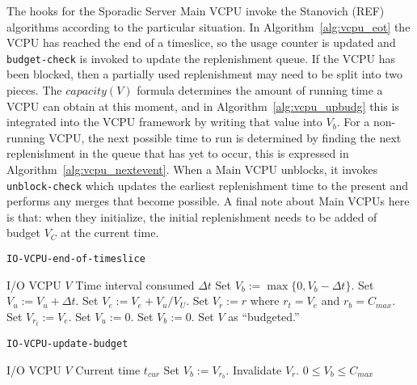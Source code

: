 \documentclass[twocolumn,10pt]{article}
\begin{document}
The hooks for the Sporadic Server Main VCPU invoke the Stanovich (REF)
algorithms according to the particular situation.  In
Algorithm~\ref{alg:vcpu_eot} the VCPU has reached the end of a
timeslice, so the usage counter is updated and {\tt budget-check} is
invoked to update the replenishment queue.  If the VCPU has been
blocked, then a partially used replenishment may need to be split into
two pieces.  The $capacity(V)$ formula determines the amount of
running time a VCPU can obtain at this moment, and in
Algorithm~\ref{alg:vcpu_upbudg} this is integrated into the VCPU
framework by writing that value into $V_b$.  For a non-running VCPU,
the next possible time to run is determined by finding the next
replenishment in the queue that has yet to occur, this is expressed in
Algorithm~\ref{alg:vcpu_nextevent}.  When a Main VCPU unblocks, it
invokes {\tt unblock-check} which updates the earliest replenishment
time to the present and performs any merges that become possible.  A
final note about Main VCPUs here is that: when they initialize, the
initial replenishment needs to be added of budget $V_C$ at the current
time.

\begin{algorithm*}
  \caption{\tt IO-VCPU-end-of-timeslice}\label{alg:iovcpu_eot}
  \begin{algorithmic}[1]
    \REQUIRE I/O VCPU $V$
    \REQUIRE Time interval consumed $\Delta t$
    \STATE Set $V_b:=\max\{0,V_b-\Delta t\}$.
    \STATE Set $V_u:=V_u+\Delta t$.
    \STATE Set $V_e:=V_e+V_u/V_U$.
    \STATE Set $V_r:=r$ where $r_t=V_e$ and $r_b=C_{max}$.
    \ELSE
    \STATE Set $V_{r_t}:=V_e$.
    \ENDIF
    \STATE Set $V_u:=0$.
    \STATE Set $V_b:=0$.
    \STATE Set $V$ as \NOT ``budgeted.''
    \ENDIF
    \ENDIF
  \end{algorithmic}
\end{algorithm*}

\begin{algorithm}
  \caption{\tt IO-VCPU-update-budget}\label{alg:iovcpu_upbudg}
  \begin{algorithmic}[1]
    \REQUIRE I/O VCPU $V$
    \REQUIRE Current time $t_{cur}$
    \STATE Set $V_b:=V_{r_b}$.
    \STATE Invalidate $V_r$.
    \ENDIF
    \ENSURE $0\leq V_b\leq C_{max}$
  \end{algorithmic}
\end{algorithm}
\end{document}
